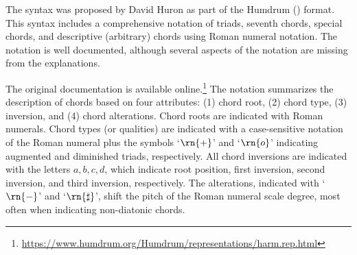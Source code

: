 The  syntax was proposed by David Huron as part
of the Humdrum () format. This syntax includes
a comprehensive notation of triads, seventh chords, special
chords, and descriptive (arbitrary) chords using Roman
numeral notation. The notation is well documented, although
several aspects of the notation are missing from the
explanations.

The original  documentation is available
online.\footnote{\href{https://www.humdrum.org/Humdrum/representations/harm.rep.html}{https://www.humdrum.org/Humdrum/representations/harm.rep.html}}
The notation summarizes the description of chords based on
four attributes: (1) chord root, (2) chord type, (3)
inversion, and (4) chord alterations. Chord roots are
indicated with Roman numerals. Chord types (or qualities)
are indicated with a case-sensitive notation of the Roman
numeral plus the symbols `$\rn{+}$' and `$\rn{o}$'
indicating augmented and diminished triads, respectively.
All chord inversions are indicated with the letters ${a, b,
c, d}$, which indicate root position, first inversion,
second inversion, and third inversion, respectively. The
alterations, indicated with `$\rn{-}$' and `$\rn{\sharp}$',
shift the pitch of the Roman numeral scale degree, most
often when indicating non-diatonic chords.
